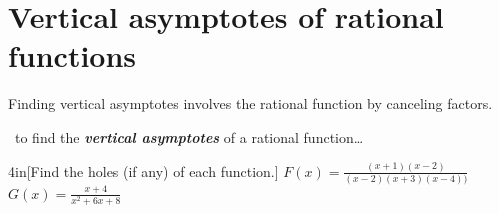 \section{Vertical asymptotes of rational functions}

Finding vertical asymptotes involves  the rational function
by canceling factors.

\begin{myConceptSteps}{~to find the {\bfseries\itshape vertical asymptotes} of a rational function\dots}
\end{myConceptSteps}


\begin{my2Problems}{4in}[Find the holes (if any) of each function.]
    {
        $F(x) = \frac{(x+1)(x-2)}{(x-2)(x+3)(x-4))}$
    }
    {
        $G(x) = \frac{x+4}{x^2 + 6x + 8}$
    }
\end{my2Problems}



